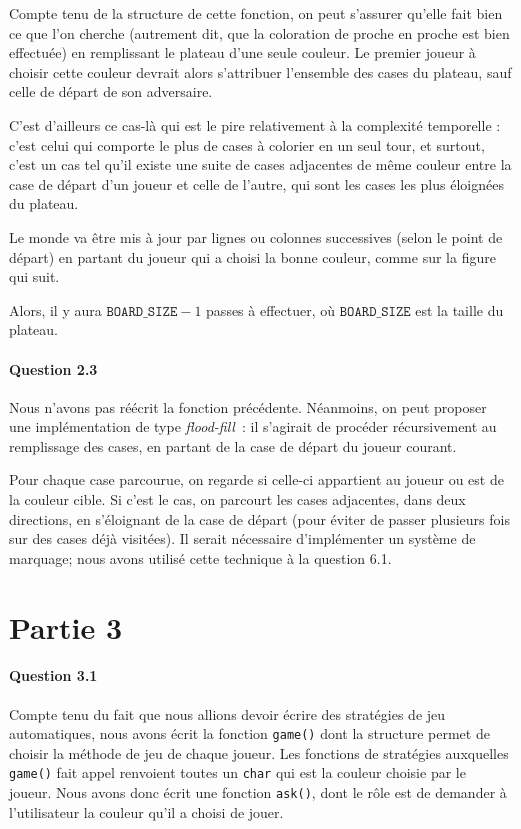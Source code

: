 \documentclass[a4paper]{article}
\newcommand{\boardsize}{\ensuremath{\mathtt{BOARD\_SIZE}}}
\begin{document}
Compte tenu de la structure de cette fonction, on peut s'assurer qu'elle fait 
bien ce que l'on cherche (autrement dit, que la coloration de proche en proche 
est bien effectuée) en remplissant le plateau d'une seule couleur. Le premier 
joueur à choisir cette couleur devrait alors s'attribuer l'ensemble des cases 
du plateau, sauf celle de départ de son adversaire. 

C'est d'ailleurs ce cas-là qui est le pire relativement à la complexité 
temporelle : c'est celui qui comporte le plus de cases à colorier en un seul 
tour, et surtout, c'est un cas tel qu'il existe une suite de cases adjacentes 
de même couleur entre la case de départ d'un joueur et celle de l'autre, qui 
sont les cases les plus éloignées du plateau.

Le monde va être mis à jour par lignes ou colonnes successives (selon le point 
de départ) en partant du joueur qui a choisi la bonne couleur, comme sur la 
figure qui suit.
%	
%	

Alors, il y aura $\boardsize-1$ passes à effectuer, où \boardsize{} est la 
taille du plateau. 

    \paragraph{Question 2.3}
    Nous n'avons pas réécrit la fonction précédente. Néanmoins, on peut 
proposer une implémentation de type \emph{flood-fill}~: il s'agirait de 
procéder récursivement au remplissage des cases, en partant de la case de 
départ du joueur courant.

Pour chaque case parcourue, on regarde si celle-ci appartient au joueur ou est 
de la couleur cible. Si c'est le cas, on parcourt les cases adjacentes, dans 
deux directions, en s'éloignant de la case de départ (pour éviter de passer 
plusieurs fois sur des cases déjà visitées). Il serait nécessaire d'implémenter 
un système de marquage; nous avons utilisé cette technique à la question 6.1.

    \section{Partie 3}
    \paragraph{Question 3.1} Compte tenu du fait que nous allions devoir 
écrire des stratégies de jeu automatiques, nous avons écrit la fonction 
\texttt{game()} dont la structure permet de choisir la méthode de jeu de chaque 
joueur. Les fonctions de stratégies auxquelles \texttt{game()} fait appel 
renvoient toutes un \texttt{char} qui est la couleur choisie par le joueur.
Nous avons donc écrit une fonction \texttt{ask()}, dont le rôle est de demander 
à l'utilisateur la couleur qu'il a choisi de jouer. 
\end{document}
